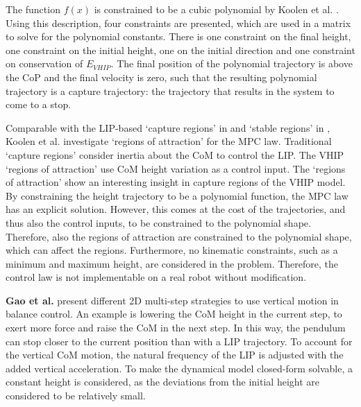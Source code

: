The function $f(x)$ is constrained to be a cubic polynomial by Koolen et al. \cite{koolen2016balance}. Using this description, four constraints are presented, which are used in a matrix to solve for the polynomial constants. There is one constraint on the final height, one constraint on the initial height, one on the initial direction and one constraint on conservation of $E_{VHIP}$. The final position of the polynomial trajectory is above the \ac{CoP} and the final velocity is zero, such that the resulting polynomial trajectory is a capture trajectory: the trajectory that results in the system to come to a stop. 

Comparable with the \ac{LIP}-based `capture regions' in \cite{pratt2006capture, koolen2012capturability} and `stable regions' in \cite{stephens2007humanoid},  Koolen et al. investigate `regions of attraction' for the \ac{MPC} law. Traditional `capture regions' consider inertia about the \ac{CoM} to control the \ac{LIP}. The \ac{VHIP} `regions of attraction' use \ac{CoM} height variation as a control input. The `regions of attraction' show an interesting insight in capture regions of the \ac{VHIP} model. By constraining the height trajectory to be a polynomial function, the \ac{MPC} law has an explicit solution. However, this comes at the cost of the trajectories, and thus also the control inputs, to be constrained to the polynomial shape. Therefore, also the regions of attraction are constrained to the polynomial shape, which can affect the regions. Furthermore, no kinematic constraints, such as a minimum and maximum height, are considered in the problem. Therefore, the control law is not implementable on a real robot without modification.

\textbf{Gao et al.} \cite{gao2017increase} present different \ac{2D} multi-step strategies to use vertical motion in balance control. An example is lowering the \ac{CoM} height in the current step, to exert more force and raise the \ac{CoM} in the next step. In this way, the pendulum can stop closer to the current position than with a \ac{LIP} trajectory. To account for the vertical \ac{CoM} motion, the natural frequency of the \ac{LIP} is adjusted with the added vertical acceleration. To make the dynamical model closed-form solvable, a constant height is considered, as the deviations from the initial height are considered to be relatively small.

